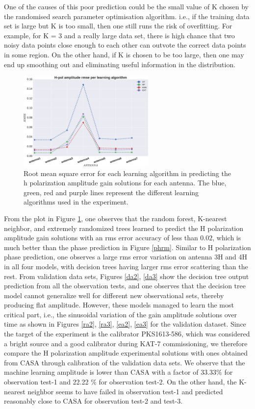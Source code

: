 One of the causes of this poor prediction could be the small value of K chosen by the randomised search parameter optimisation algorithm. i.e., if the training data set is large but K is too small, then one still runs the risk of overfitting. For example, for K = 3 and a really large data set, there is high  chance that two noisy data points close enough to each other can outvote the correct data points in some region. On the other hand, if K is chosen to be too large, then one may end up smoothing out and eliminating useful  information in the distribution. 
\begin{figure}[H]
  \centering
    \includegraphics[width=0.6\textwidth]{images/Hpol-amp.eps}
    \caption{Root mean square error for each learning algorithm in predicting the h polarization amplitude gain solutions for each antenna. The blue, green, red and purple lines represent the different learning algorithms used in the experiment.}
  \label{amprm}
 \end{figure} 

From the plot in Figure \ref{amprm}, one observes that the random forest, K-nearest neighbor, and extremely randomized trees learned to predict the H polarization amplitude gain solutions with an rms error accuracy of less than $0.02$, which is much better than the phase prediction in Figure \ref{phrm}. Similar to H polarization phase prediction, one observes a large rms error variation on antenna 3H and 4H in all four models, with decision trees having larger rms error scattering than the rest. From validation data sets, Figures \ref{da2}, \ref{da3} show the decision tree output prediction from all the observation tests, and one observes that the decision tree model cannot generalize well for different new observational sets, thereby producing flat amplitude. However, these models managed to learn the most critical part, i.e., the sinusoidal variation of the gain amplitude solutions over time as shown in Figures \ref{ra2}, \ref{ra3}, \ref{ea2}, \ref{ea3} for the validation dataset. Since the target of the experiment is the calibrator PKS1613-586, which was considered a bright source and a good calibrator during KAT-7 commissioning, we therefore compare the H polarization amplitude experimental solutions with ones obtained from CASA through calibration of the validation data sets. We observe that the machine learning amplitude is lower than CASA with a factor of 33.33$\%$ for observation test-1 and 22.22 $\%$ for observation test-2. On the other hand, the K-nearest neighbor seems to have failed in observation test-1 and predicted reasonably close to CASA for observation test-2 and test-3.

